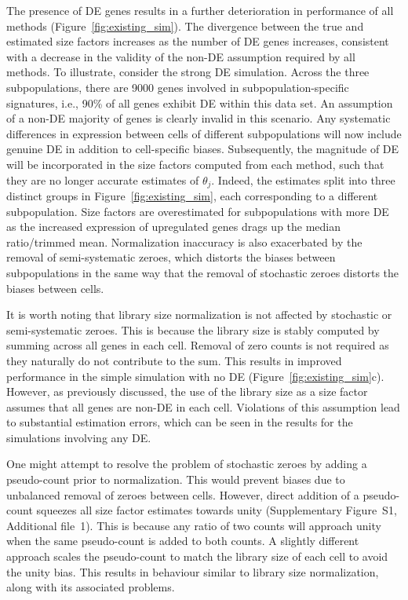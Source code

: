 \documentclass{bmcart}
\newcommand{\supppseudo}{S1}
\begin{document}
The presence of DE genes results in a further deterioration in performance of all methods (Figure~\ref{fig:existing_sim}).
The divergence between the true and estimated size factors increases as the number of DE genes increases,
    consistent with a decrease in the validity of the non-DE assumption required by all methods.
To illustrate, consider the strong DE simulation.
Across the three subpopulations, there are 9000 genes involved in subpopulation-specific signatures, i.e., 90\% of all genes exhibit DE within this data set.
An assumption of a non-DE majority of genes is clearly invalid in this scenario.
Any systematic differences in expression between cells of different subpopulations will now include genuine DE in addition to cell-specific biases.
Subsequently, the magnitude of DE will be incorporated in the size factors computed from each method, such that they are no longer accurate estimates of $\theta_j$.
Indeed, the estimates split into three distinct groups in Figure~\ref{fig:existing_sim}, each corresponding to a different subpopulation.
Size factors are overestimated for subpopulations with more DE as the increased expression of upregulated genes drags up the median ratio/trimmed mean.
Normalization inaccuracy is also exacerbated by the removal of semi-systematic zeroes, which distorts the biases between subpopulations in the same way that the removal of stochastic zeroes distorts the biases between cells.

It is worth noting that library size normalization is not affected by stochastic or semi-systematic zeroes.
This is because the library size is stably computed by summing across all genes in each cell.
Removal of zero counts is not required as they naturally do not contribute to the sum.
This results in improved performance in the simple simulation with no DE (Figure~\ref{fig:existing_sim}c).
However, as previously discussed, the use of the library size as a size factor assumes that all genes are non-DE in each cell.
Violations of this assumption lead to substantial estimation errors, which can be seen in the results for the simulations involving any DE.

One might attempt to resolve the problem of stochastic zeroes by adding a pseudo-count prior to normalization.
This would prevent biases due to unbalanced removal of zeroes between cells.
However, direct addition of a pseudo-count squeezes all size factor estimates towards unity (Supplementary Figure~\supppseudo{}, Additional file~1).
This is because any ratio of two counts will approach unity when the same pseudo-count is added to both counts.
A slightly different approach scales the pseudo-count to match the library size of each cell to avoid the unity bias.
This results in behaviour similar to library size normalization, along with its associated problems.
\end{document}
